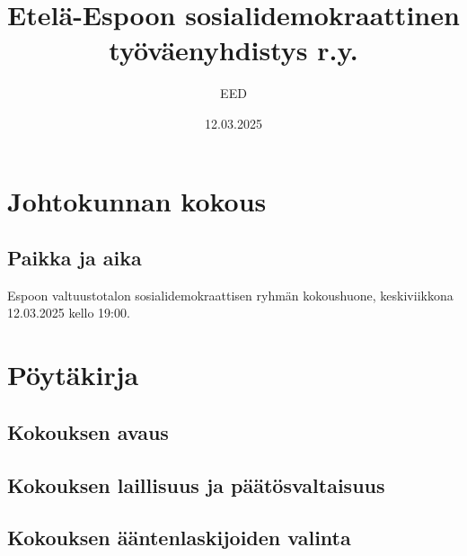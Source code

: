 \documentclass[a4paper,12pt]{article}
\title{Etelä-Espoon sosialidemokraattinen työväenyhdistys r.y.}
\author{EED}
\date{12.03.2025}
\begin{document}
\maketitle
\tableofcontents
\section*{Johtokunnan kokous}
\subsection*{Paikka ja aika}
Espoon valtuustotalon sosialidemokraattisen ryhmän kokoushuone, keskiviikkona 12.03.2025 kello 19:00.
\section*{Pöytäkirja}
\subsection{Kokouksen avaus}
\subsection{Kokouksen laillisuus ja päätösvaltaisuus}
\subsection{Kokouksen ääntenlaskijoiden valinta}
\end{document}
